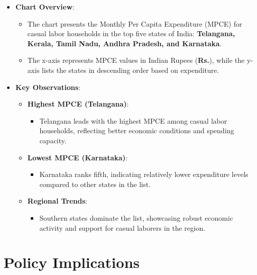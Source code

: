 \documentclass{article}
\begin{document}
\begin{itemize}
	\item \textbf{Chart Overview}:
	\begin{itemize}
		\item The chart presents the Monthly Per Capita Expenditure (MPCE) for casual labor households in the top five states of India: \textbf{Telangana, Kerala, Tamil Nadu, Andhra Pradesh, and Karnataka}.
		\item The x-axis represents MPCE values in Indian Rupees (\textbf{Rs.}), while the y-axis lists the states in descending order based on expenditure.
	\end{itemize}
	\item \textbf{Key Observations}:
	\begin{itemize}
		\item \textbf{Highest MPCE (Telangana)}:
		\begin{itemize}
			\item Telangana leads with the highest MPCE among casual labor households, reflecting better economic conditions and spending capacity.
		\end{itemize}
		\item \textbf{Lowest MPCE (Karnataka)}:
		\begin{itemize}
			\item Karnataka ranks fifth, indicating relatively lower expenditure levels compared to other states in the list.
		\end{itemize}
		\item \textbf{Regional Trends}:
		\begin{itemize}
			\item Southern states dominate the list, showcasing robust economic activity and support for casual laborers in the region.
		\end{itemize}
	\end{itemize}
\end{itemize}

\section*{Policy Implications}
\end{document}
